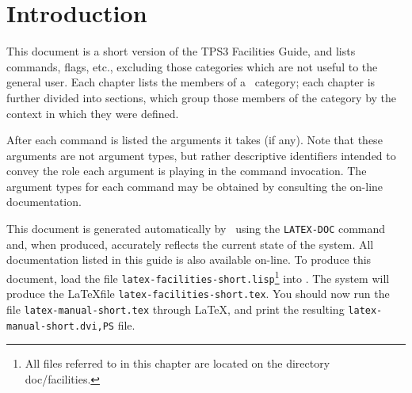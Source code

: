 \chapter{Introduction}

This document is a short version of the TPS3 Facilities Guide, and 
lists \TPS commands, flags, etc.,  excluding those categories which
are not useful to the general user.
Each chapter lists the members of a \TPS~category; each chapter is further
divided into sections, which group those members of the category by
the context in which they were defined.

After each command is listed the arguments it takes (if any).  Note that
these arguments are not argument types, but rather descriptive identifiers
intended to convey the role each argument is playing in the command 
invocation.  The argument types for each command may be obtained by
consulting the on-line documentation.

This document is generated automatically by \TPS~using the \texttt{LATEX-DOC}
command and, when produced, accurately reflects the current state of
the system. All documentation listed in this guide is also available on-line.
To produce this document, load the file \texttt{latex-facilities-short.lisp}\footnote{All
files referred to in this chapter are located on the directory
doc/facilities.}
into \TPS. The system will produce the \LaTeX file \texttt{latex-facilities-short.tex}.
You should now run the file \texttt{latex-manual-short.tex} through \LaTeX , and print the
resulting \texttt{latex-manual-short.{dvi,PS}} file.
